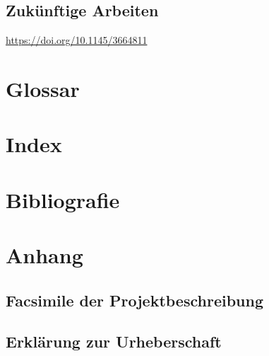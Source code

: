 \documentclass[a4paper,12pt]{report}
\begin{document}
    \section{Zukünftige Arbeiten}\label{sec:zukunftigearbeiten}
    \url{https://doi.org/10.1145/3664811}


    \chapter{Glossar}


    \chapter{Index}


    \chapter{Bibliografie}


    \chapter{Anhang}


    \section{Facsimile der Projektbeschreibung}


    \section{Erklärung zur Urheberschaft}
\end{document}
